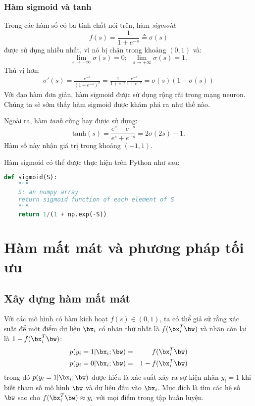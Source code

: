  
\subsubsection{Hàm sigmoid và tanh}

Trong các hàm số có ba tính chất nói trên, hàm \textit{sigmoid}: 
\begin{equation} 
f(s) = \frac{1}{1 + e^{-s}} \triangleq \sigma(s) 
\end{equation} 
được sử dụng nhiều nhất, vì nó bị chặn trong khoảng $(0, 1)$ và:
\begin{equation} 
\lim_{s \rightarrow -\infty}\sigma(s) = 0; ~~ \lim_{s \rightarrow +\infty}\sigma(s) = 1.
\end{equation} 
Thú vị hơn:
\begin{eqnarray} 
\sigma'(s) = \frac{e^{-s}}{(1 + e^{-s})^2} 
= \frac{1}{1 + e^{-s}} \frac{e^{-s}}{1 + e^{-s}} 
= \sigma(s)(1 - \sigma(s)) 
\end{eqnarray} 
Với đạo hàm đơn giản, hàm sigmoid được sử dụng rộng rãi trong mạng neuron. {Chúng ta sẽ sớm thấy hàm sigmoid được khám phá ra như thế nào.}
 
Ngoài ra, hàm \textit{tanh} cũng hay được sử dụng: 
\begin{equation} 
\displaystyle
\text{tanh}(s) = \frac{e^{s} - e^{-s}}{e^s + e^{-s}} = 2\sigma(2s) - 1.
\end{equation} 
Hàm số này nhận giá trị trong khoảng $(-1, 1)$. 

Hàm sigmoid có thể được thực hiện trên Python như sau:
\begin{lstlisting}[language=Python]
def sigmoid(S):
    """
    S: an numpy array
    return sigmoid function of each element of S
    """
    return 1/(1 + np.exp(-S))
\end{lstlisting}



 
 
\section{Hàm mất mát và phương pháp tối ưu}
 
 
\subsection{Xây dựng hàm mất mát}
 
Với các mô hình có hàm kích hoạt $f(s) \in (0, 1)$, ta có thể
giả sử rằng xác suất để một điểm dữ liệu $\bx_i$ có nhãn thứ nhất là
$f(\bx_i^T\bw)$ và nhãn còn lại là $1 -
f(\bx_i^T\bw)$:
\begin{eqnarray} 
\label{eqn:10_1}
p(y_i = 1 | \bx_i; \bw) &=& f(\bx_i^T\bw)  \\
\label{eqn:10_2}
p(y_i = 0 | \bx_i; \bw) &=& 1 - f(\bx_i^T\bw)
\end{eqnarray} 
trong đó $p(y_i = 1 | \bx_i; \bw)$ được hiểu là xác suất xảy ra sự
kiện nhãn $y_i = 1$ khi biết tham số mô hình $\bw$ và dữ liệu đầu vào
$\bx_i$. 
Mục đích là tìm các hệ số $\bw$ sao cho $f(\bx_i^T\bw) \approx y_i$ với mọi điểm trong tập huấn luyện. 

